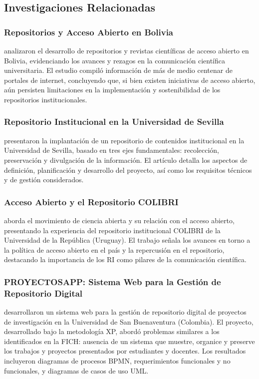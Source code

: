 \subsection{Investigaciones Relacionadas}

\subsubsection{Repositorios y Acceso Abierto en Bolivia}

\textcite{perales2022repositorios} analizaron el desarrollo de repositorios y revistas científicas de acceso abierto en Bolivia, evidenciando los avances y rezagos en la comunicación científica universitaria. El estudio compiló información de más de medio centenar de portales de internet, concluyendo que, si bien existen iniciativas de acceso abierto, aún persisten limitaciones en la implementación y sostenibilidad de los repositorios institucionales.

\subsubsection{Repositorio Institucional en la Universidad de Sevilla}

\textcite{leon2012implantacion} presentaron la implantación de un repositorio de contenidos institucional en la Universidad de Sevilla, basado en tres ejes fundamentales: recolección, preservación y divulgación de la información. El artículo detalla los aspectos de definición, planificación y desarrollo del proyecto, así como los requisitos técnicos y de gestión considerados.

\subsubsection{Acceso Abierto y el Repositorio COLIBRI}

\textcite{seroubian2022acceso} aborda el movimiento de ciencia abierta y su relación con el acceso abierto, presentando la experiencia del repositorio institucional COLIBRI de la Universidad de la República (Uruguay). El trabajo señala los avances en torno a la política de acceso abierto en el país y la repercusión en el repositorio, destacando la importancia de los RI como pilares de la comunicación científica.

\subsubsection{PROYECTOSAPP: Sistema Web para la Gestión de Repositorio Digital}

\textcite{mesa2019proyectosapp} desarrollaron un sistema web para la gestión de repositorio digital de proyectos de investigación en la Universidad de San Buenaventura (Colombia). El proyecto, desarrollado bajo la metodología XP, abordó problemas similares a los identificados en la FICH: ausencia de un sistema que muestre, organice y preserve los trabajos y proyectos presentados por estudiantes y docentes. Los resultados incluyeron diagramas de procesos BPMN, requerimientos funcionales y no funcionales, y diagramas de casos de uso UML.

\endinput
